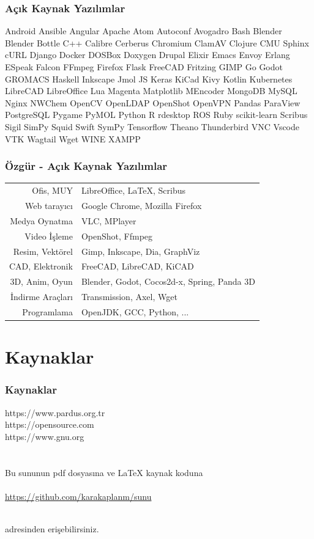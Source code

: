 \documentclass[english,svgnames,notes=hide,12pt]{beamer}
\begin{document}
\begin{frame}
\frametitle{Açık Kaynak Yazılımlar}
Android
Ansible
Angular
Apache
Atom
Autoconf
Avogadro
Bash
Blender
Blender 
Bottle
C++
Calibre 
Cerberus
Chromium
ClamAV
Clojure
CMU Sphinx 
cURL
Django
Docker
DOSBox
Doxygen
Drupal
Elixir
Emacs
Envoy
Erlang
ESpeak
Falcon
FFmpeg
Firefox
Flask
FreeCAD
Fritzing
GIMP 
Go
Godot 
GROMACS 
Haskell
Inkscape 
Jmol
JS
Keras
KiCad
Kivy
Kotlin
Kubernetes
LibreCAD 
LibreOffice
Lua
Magenta
Matplotlib
MEncoder
MongoDB
MySQL‎
Nginx
NWChem 
OpenCV
OpenLDAP
OpenShot
OpenVPN
Pandas
ParaView 
PostgreSQL‎
Pygame
PyMOL 
Python
R
rdesktop
ROS
Ruby
scikit-learn
Scribus
Sigil
SimPy
Squid
Swift
SymPy
Tensorflow
Theano
Thunderbird
VNC
Vscode
VTK 
Wagtail
Wget
WINE
XAMPP
\end{frame}

\begin{frame}
\frametitle{Özgür - Açık Kaynak Yazılımlar}
\begin{tabular}{rl}
Ofis, MUY & LibreOffice,  \LaTeX{}, Scribus\\
Web tarayıcı &Google Chrome, Mozilla Firefox\\
Medya Oynatma &VLC, MPlayer\\
Video İşleme & OpenShot, Ffmpeg \\
Resim, Vektörel& Gimp, Inkscape, Dia, GraphViz\\
CAD, Elektronik  &FreeCAD, LibreCAD, KiCAD\\
	3D, Anim, Oyun & Blender, Godot, Cocos2d-x, Spring, Panda 3D  \\
İndirme Araçları & Transmission, Axel, Wget\\ 
Programlama & OpenJDK, GCC, Python, ...\\ 
\end{tabular}
\end{frame}




\section{Kaynaklar}
\begin{frame}
    \frametitle{Kaynaklar}
https://www.pardus.org.tr\\
https://opensource.com\\
https://www.gnu.org \\
~\\
~\\
	Bu sununun pdf dosyasına ve \LaTeX{} kaynak koduna \\
~\\
\href{https://github.com/karakaplanm/sunu}{https://github.com/karakaplanm/sunu}

~\\
adresinden erişebilirsiniz.

\end{frame}
\end{document}
